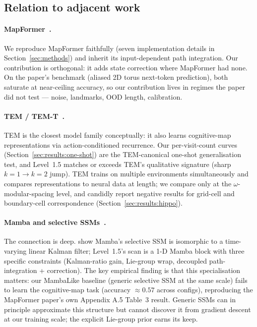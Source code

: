 \subsection{Relation to adjacent work}

\paragraph{MapFormer~\citep{rambaud2025mapformer}.} We reproduce
MapFormer faithfully (seven implementation details in
Section~\ref{sec:methods}) and inherit its input-dependent path
integration. Our contribution is orthogonal: it adds state correction
where MapFormer had none. On the paper's benchmark (aliased 2D torus
next-token prediction), both saturate at near-ceiling accuracy, so our
contribution lives in regimes the paper did not test --- noise,
landmarks, OOD length, calibration.

\paragraph{TEM / TEM-T~\citep{whittington2020tem,whittington2022tem-t}.}
TEM is the closest model family conceptually: it also learns
cognitive-map representations via action-conditioned recurrence. Our
per-visit-count curves (Section~\ref{sec:results:one-shot}) are the
TEM-canonical one-shot generalisation test, and Level~1.5 matches or
exceeds TEM's qualitative signature (sharp $k{=}1 \to k{=}2$ jump). TEM
trains on multiple environments simultaneously and compares
representations to neural data at length; we compare only at the
$\omega$-modular-spacing level, and candidly report negative results for
grid-cell and boundary-cell correspondence
(Section~\ref{sec:results:hippo}).

\paragraph{Mamba and selective SSMs~\citep{gu2024mamba}.} The connection
is deep. \citet{wang2025mamba-kalman} show Mamba's selective SSM is
isomorphic to a time-varying linear Kalman filter; Level~1.5's scan is
a 1-D Mamba block with three specific constraints (Kalman-ratio gain,
Lie-group wrap, decoupled path-integration + correction). The key
empirical finding is that this specialisation matters: our MambaLike
baseline (generic selective SSM at the same scale) fails to learn the
cognitive-map task (accuracy $\approx 0.57$ across configs), reproducing
the MapFormer paper's own Appendix A.5 Table~3 result. Generic SSMs can
in principle approximate this structure but cannot discover it from
gradient descent at our training scale; the explicit Lie-group prior
earns its keep.

